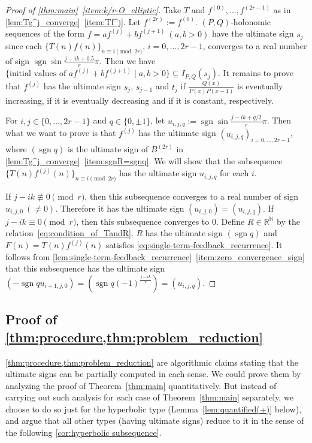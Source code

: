 \documentclass[a4paper,UKenglish,cleveref,autoref,thm-restate]{lipics-v2021}
\newcommand{\R}{\mathbb{R}}
\newcommand{\N}{\mathbb{N}}
\DeclareMathOperator{\sgn}{sgn}
\begin{document}
\begin{proof}[Proof of \cref{thm:main}~\eqref{item:k/r-O_elliptic}]
Take $T$ and $f^{(0)}, \dots, f^{(2r-1)}$ as in \cref{lem:Tg^j_converge}~\eqref{item:Tf^j}. Let $f^{(2r)} := f^{(0)}$. $(P, Q)$-holonomic sequences of the form $f = a f^{(j)} + b f^{(j+1)} \ (a, b > 0)$ have the ultimate sign $s_j$ since each $\{ T(n)f(n) \}_{n \equiv i \pmod{2r}}$, $i=0, \dots, 2r-1$, converges to a real number of sign $\sgn \sin \frac{j - ik + 0.5}r \pi$. Then we have $\{ \text{initial values of } a f^{(j)} +  b f^{(j+1)}  \mid a, b > 0 \} \subseteq I_{P, Q}(s_{j}) $. It remains to prove that $f^{(j)}$ has the ultimate sign $s_{j}$, $s_{j-1}$ and $t_j$ if $\frac{Q(x)}{P(x)P(x-1)}$ is eventually increasing, if it is eventually decreasing and if it is constant, respectively. 

For $i, j \in \{ 0, \dots, 2r-1 \}$ and $q \in \{ 0, \pm 1\}$, let $u_{i, j, q} := \sgn \sin \frac{j-ik+q/2}r \pi$. Then what we want to prove is that $f^{(j)}$ has the ultimate sign $(u_{i, j, q})_{i=0, \dots, 2r-1}$, where $(\sgn q)$ is the ultimate sign of $B^{(2r)}$ in \cref{lem:Tg^j_converge}~\eqref{item:sgnR=sgnq}. We will show that the subsequence $\{ T(n)f^{(j)}(n) \}_{n \equiv i \pmod{2r}}$ has the ultimate sign $u_{i, j, q}$ for each $i$. 

If $j - ik \not\equiv 0 \pmod{r}$, then this subsequence converges to a real number of sign $u_{i, j, 0} \ (\neq 0)$. Therefore it has the ultimate sign $(u_{i, j, 0}) = (u_{i, j, q})$. If $j - ik \equiv 0 \pmod{r}$, then this subsequence converges to $0$. Define $R \in \R^{\N}$ by the relation~\eqref{eq:condition_of_TandR}. $R$ has the ultimate sign $(\sgn q)$ and $F(n) = T(n)f^{(j)}(n)$ satisfies \eqref{eq:single-term-feedback_recurrence}. It follows from \cref{lem:single-term-feedback_recurrence}~\eqref{item:zero_convergence_sign} that this subsequence has the ultimate sign $(-\sgn q u_{i+1, j, 0}) = (\sgn q (-1)^{\frac{j-ik}r} ) = (u_{i, j, q})$. 
\end{proof}



\subsection{Proof of \cref{thm:procedure,thm:problem_reduction}} \label{sec:proof_of_thm:procedure}

\cref{thm:procedure,thm:problem_reduction} are algorithmic claims stating that
the ultimate signs can be partially computed in each sense. 
We could prove them by analyzing the proof of Theorem~\ref{thm:main} quantitatively. 
But instead of carrying out such analysis for each case of Theorem~\ref{thm:main} separately, 
we choose to do so just for the hyperbolic type (Lemma~\ref{lem:quantified(+)} below),
and argue that all other types (having ultimate signs) reduce to it
in the sense of the following \cref{cor:hyperbolic subsequence}.
\end{document}
